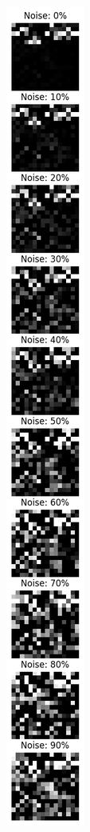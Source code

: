 \begin{figure}[ht]
    \centering
    \begin{minipage}{0.45\textwidth}
        \centering
        \includegraphics[width=0.3\linewidth]{images/vertical_noise_grid_100.png}

\end{minipage}
\end{figure}
